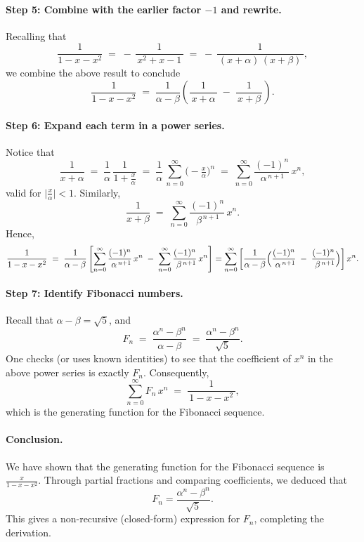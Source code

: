 \documentclass{article}
\begin{document}
\paragraph{Step 5: Combine with the earlier factor \(-1\) and rewrite.}

Recalling that
\[
\frac{1}{1 - x - x^2}
\;=\;
-\,\frac{1}{\,x^2 + x - 1\,}
\;=\;
-\,\frac{1}{\,(x+\alpha)\,(x+\beta)\,},
\]
we combine the above result to conclude
\[
\frac{1}{1 - x - x^2}
\;=\;
\frac{1}{\alpha - \beta}
\left(
\frac{1}{\,x+\alpha\,}
\;-\;
\frac{1}{\,x+\beta\,}
\right).
\]

\paragraph{Step 6: Expand each term in a power series.}

Notice that
\[
\frac{1}{x + \alpha}
\;=\;
\frac{1}{\alpha}\,\frac{1}{1 + \tfrac{x}{\alpha}}
\;=\;
\frac{1}{\alpha}\,\sum_{n=0}^\infty \bigl(-\tfrac{x}{\alpha}\bigr)^{n}
\;=\;
\sum_{n=0}^\infty
\frac{(-1)^n}{\,\alpha^{\,n+1}\!}\,
x^n,
\]
valid for \(\bigl|\tfrac{x}{\alpha}\bigr| < 1\).  Similarly,
\[
\frac{1}{x + \beta}
\;=\;
\sum_{n=0}^\infty
\frac{(-1)^n}{\,\beta^{\,n+1}\!}\,
x^n.
\]
Hence,
\[
\frac{1}{1 - x - x^2}
\;=\;
\frac{1}{\alpha - \beta}
\left[
\sum_{n=0}^\infty \frac{(-1)^n}{\,\alpha^{\,n+1}\!}\,x^n
\;-\;
\sum_{n=0}^\infty \frac{(-1)^n}{\,\beta^{\,n+1}\!}\,x^n
\right]
=
\sum_{n=0}^\infty
\left[
\frac{1}{\alpha - \beta}
\Bigl(
\frac{(-1)^n}{\,\alpha^{\,n+1}\!}
\;-\;
\frac{(-1)^n}{\,\beta^{\,n+1}\!}
\Bigr)
\right]
x^n.
\]

\paragraph{Step 7: Identify Fibonacci numbers.}

Recall that \(\alpha - \beta = \sqrt{5}\), and
\[
F_n
\;=\;
\frac{\alpha^n - \beta^n}{\,\alpha - \beta\,}
\;=\;
\frac{\alpha^n - \beta^n}{\,\sqrt{5}\,}.
\]
One checks (or uses known identities) to see that the coefficient of \(x^n\) in the above power series is exactly \(F_n\).  Consequently,
\[
\sum_{n=0}^\infty F_n \, x^n
\;=\;
\frac{1}{\,1 - x - x^2\,},
\]
which is the generating function for the Fibonacci sequence.

\paragraph{Conclusion.}
We have shown that the generating function for the Fibonacci sequence is 
\(\tfrac{x}{1 - x - x^2}\).  
Through partial fractions and comparing coefficients, we deduced that
\[
F_n = \frac{\alpha^n - \beta^n}{\sqrt{5}}.
\]
This gives a non-recursive (closed-form) expression for \(F_n\), completing the derivation.
\end{document}

